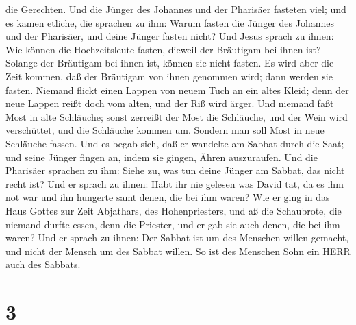 die Gerechten.  Und die Jünger des Johannes und der
Pharisäer fasteten viel; und es kamen etliche, die sprachen zu ihm:
Warum fasten die Jünger des Johannes und der Pharisäer, und deine Jünger
fasten nicht?  Und Jesus sprach zu ihnen: Wie können die
Hochzeitsleute fasten, dieweil der Bräutigam bei ihnen ist? Solange der
Bräutigam bei ihnen ist, können sie nicht fasten.  Es wird
aber die Zeit kommen, daß der Bräutigam von ihnen genommen wird; dann
werden sie fasten.  Niemand flickt einen Lappen von neuem
Tuch an ein altes Kleid; denn der neue Lappen reißt doch vom alten, und
der Riß wird ärger.  Und niemand faßt Most in alte
Schläuche; sonst zerreißt der Most die Schläuche, und der Wein wird
verschüttet, und die Schläuche kommen um. Sondern man soll Most in neue
Schläuche fassen.  Und es begab sich, daß er wandelte am
Sabbat durch die Saat; und seine Jünger fingen an, indem sie gingen,
Ähren auszuraufen.  Und die Pharisäer sprachen zu ihm:
Siehe zu, was tun deine Jünger am Sabbat, das nicht recht ist?
 Und er sprach zu ihnen: Habt ihr nie gelesen was David
tat, da es ihm not war und ihn hungerte samt denen, die bei ihm waren?
 Wie er ging in das Haus Gottes zur Zeit Abjathars, des
Hohenpriesters, und aß die Schaubrote, die niemand durfte essen, denn
die Priester, und er gab sie auch denen, die bei ihm waren?
 Und er sprach zu ihnen: Der Sabbat ist um des Menschen
willen gemacht, und nicht der Mensch um des Sabbat willen. 
So ist des Menschen Sohn ein HERR auch des Sabbats.

\hypertarget{section-2}{%
\section{3}\label{section-2}}

